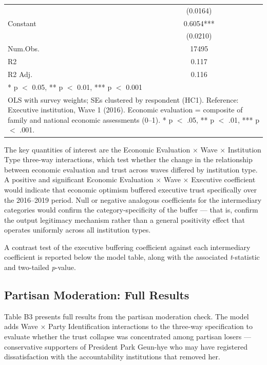 \documentclass[
  12pt,
  letterpaper]{article}
\begin{document}
\begin{table}
{\begin{tabular}[t]{lc}
 & (\num{0.0164})\\
Constant & \num{0.6054}***\\
 & (\num{0.0210})\\
\midrule
Num.Obs. & \num{17495}\\
R2 & \num{0.117}\\
R2 Adj. & \num{0.116}\\
\bottomrule
\multicolumn{2}{l}{\rule{0pt}{1em}* p $<$ 0.05, ** p $<$ 0.01, *** p $<$ 0.001}\\
\multicolumn{2}{l}{\rule{0pt}{1em}OLS with survey weights; SEs clustered by respondent (HC1). Reference: Executive institution, Wave 1 (2016). Economic evaluation = composite of family and national economic assessments (0–1). * p $<$ .05, ** p $<$ .01, *** p $<$ .001.}\\
\end{tabular}

}

\end{table}%

The key quantities of interest are the Economic Evaluation × Wave ×
Institution Type three-way interactions, which test whether the change
in the relationship between economic evaluation and trust across waves
differed by institution type. A positive and significant Economic
Evaluation × Wave × Executive coefficient would indicate that economic
optimism buffered executive trust specifically over the 2016--2019
period. Null or negative analogous coefficients for the intermediary
categories would confirm the category-specificity of the buffer --- that
is, confirm the output legitimacy mechanism rather than a general
positivity effect that operates uniformly across all institution types.

A contrast test of the executive buffering coefficient against each
intermediary coefficient is reported below the model table, along with
the associated \emph{t}-statistic and two-tailed \emph{p}-value.

\subsection{Partisan Moderation: Full Results}\label{sec-partisan-full}

Table B3 presents full results from the partisan moderation check. The
model adds Wave × Party Identification interactions to the three-way
specification to evaluate whether the trust collapse was concentrated
among partisan losers --- conservative supporters of President Park
Geun-hye who may have registered dissatisfaction with the accountability
institutions that removed her.
\end{document}
